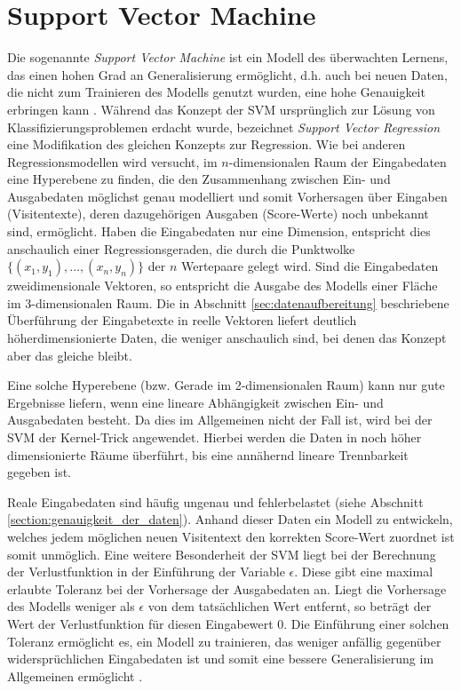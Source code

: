 \section{Support Vector Machine}
Die sogenannte \textit{Support Vector Machine} ist ein Modell des überwachten Lernens, das einen hohen Grad an Generalisierung ermöglicht, d.h. auch bei neuen Daten, die nicht zum Trainieren des Modells genutzt wurden, eine hohe Genauigkeit erbringen kann \citep{Awad2015}. Während das Konzept der SVM ursprünglich zur Lösung von Klassifizierungsproblemen erdacht wurde, bezeichnet \textit{Support Vector Regression} eine Modifikation des gleichen Konzepts zur Regression. Wie bei anderen Regressionsmodellen wird versucht, im $n$-dimensionalen Raum der Eingabedaten eine Hyperebene zu finden, die den Zusammenhang zwischen Ein- und Ausgabedaten möglichst genau modelliert und somit Vorhersagen über Eingaben (Visitentexte), deren dazugehörigen Ausgaben (Score-Werte) noch unbekannt sind, ermöglicht. Haben die Eingabedaten nur eine Dimension, entspricht dies anschaulich einer Regressionsgeraden, die durch die Punktwolke $\{(x_1, y_1), \dots, (x_n, y_n)\}$ der $n$ Wertepaare gelegt wird. Sind die Eingabedaten zweidimensionale Vektoren, so entspricht die Ausgabe des Modells einer Fläche im 3-dimensionalen Raum. Die in Abschnitt \ref{sec:datenaufbereitung} beschriebene Überführung der Eingabetexte in reelle Vektoren liefert deutlich höherdimensionierte Daten, die weniger anschaulich sind, bei denen das Konzept aber das gleiche bleibt.

Eine solche Hyperebene (bzw. Gerade im 2-dimensionalen Raum) kann nur gute Ergebnisse liefern, wenn eine lineare Abhängigkeit zwischen Ein- und Ausgabedaten besteht. Da dies im Allgemeinen nicht der Fall ist, wird bei der SVM der Kernel-Trick angewendet. Hierbei werden die Daten in  noch höher dimensionierte Räume überführt, bis eine annähernd lineare Trennbarkeit gegeben ist.

Reale Eingabedaten sind häufig ungenau und fehlerbelastet (siehe Abschnitt \ref{section:genauigkeit_der_daten}). Anhand dieser Daten ein Modell zu entwickeln, welches jedem möglichen neuen Visitentext den korrekten Score-Wert zuordnet ist somit unmöglich. Eine weitere Besonderheit der SVM liegt bei der Berechnung der Verlustfunktion in der Einführung der Variable $\epsilon$. Diese gibt eine maximal erlaubte Toleranz bei der Vorhersage der Ausgabedaten an. Liegt die Vorhersage des Modells weniger als $\epsilon$ von dem tatsächlichen Wert entfernt, so beträgt der Wert der Verlustfunktion für diesen Eingabewert 0. Die Einführung einer solchen Toleranz ermöglicht es, ein Modell zu trainieren, das weniger anfällig gegenüber widersprüchlichen Eingabedaten ist und somit eine bessere Generalisierung im Allgemeinen ermöglicht \citep{Awad2015}.

